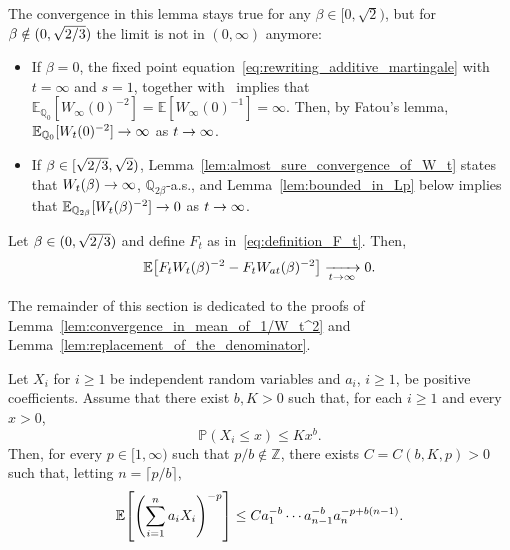 \documentclass[AHL,Unicode,longabstracts,published]{cedram}
\newcommand{\E}{\mathbb{E}}
\renewcommand{\P}{\mathbb{P}}
\newcommand{\Q}{\mathbb{Q}}
\newcommand{\Z}{\mathbb{Z}}
\newcommand\1{\mathds{1}}
\newcommand{\Expec}[1]{\mathbb{E}\left[#1\right]}
\let\originalleft\left
\let\originalright\right
\renewcommand{\left}{\mathopen{}\mathclose\bgroup\originalleft}
\renewcommand{\right}{\aftergroup\egroup\originalright}
\renewcommand*{\to}{\mathchoice{\longrightarrow}{\rightarrow}{\rightarrow}{\rightarrow}}
\begin{document}
\begin{rema}\label{rem:mean_of_ratios}
The convergence in this lemma stays true for any $\beta \in [0, \sqrt{2})$, but for $\beta \notin (0, \sqrt{2\smash{/}3})$ the limit is not in $(0,\infty)$ anymore:
\begin{itemize}
\item If $\beta = 0$, the fixed point equation~\eqref{eq:rewriting_additive_martingale} with $t=\infty$ and $s=1$, together with~\cite[Theorem~2.4]{Liu2001} implies that $\E_{\Q_0}[W_\infty(0)^{-2}] = \E [W_\infty(0)^{-1}] = \infty$. Then, by Fatou's lemma, $\E_{\Q_0}[W_t(0)^{-2}] \to \infty$ as $t \to \infty$.
\item If $\beta \in [\sqrt{2\smash{/}3}, \sqrt{2})$, Lemma~\ref{lem:almost_sure_convergence_of_W_t} states that $W_t(\beta) \to \infty$, $\Q_{2\beta}$-a.s., and Lemma~\ref{lem:bounded_in_Lp} below implies that $\E_{\Q_{2\beta}}[W_t(\beta)^{-2}] \to 0$ as $t \to \infty$.
\end{itemize}
\end{rema}

\begin{lemm}\label{lem:replacement_of_the_denominator}
Let $\beta \in (0, \sqrt{2\smash{/}3})$ and define $F_t$ as in~\eqref{eq:definition_F_t}. Then,
\begin{equation*}
\E \left[F_t W_t(\beta)^{-2} - F_t W_{at}(\beta)^{-2} \right] \xrightarrow[t \to \infty]{} 0.
\end{equation*}
\end{lemm}

The remainder of this section is dedicated to the proofs of Lemma~\ref{lem:convergence_in_mean_of_1/W_t^2} and Lemma~\ref{lem:replacement_of_the_denominator}.

\begin{lemm}\label{lem:negative_moments_linear_combination}
Let $X_i$ for $i \geq 1$ be independent random variables and $a_i$, $i \geq 1$, be positive coefficients. Assume that there exist $b, K > 0$ such that, for each $i \geq 1$ and every $x > 0$,
\begin{equation*}
\P(X_i \leq x) \leq K x^b.
\end{equation*}
Then, for every $p \in [1, \infty)$ such that $p/b \notin \Z$, there exists $C = C(b,K,p) >0$ such that, letting $n = \lceil p/b \rceil$,
\begin{equation*}
\Expec{\left(\sum_{i = 1}^n a_i X_i \right)^{-p}} \leq C a_1^{-b} \cdots a_{n - 1}^{-b} a_n^{-p + b(n - 1)}.
\end{equation*}
\end{lemm}
\end{document}
